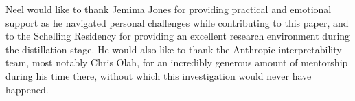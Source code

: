 \documentclass{article} %
\begin{document}
Neel would like to thank Jemima Jones for providing practical and emotional support as he navigated personal challenges while contributing to this paper, and to the Schelling Residency for providing an excellent research environment during the distillation stage. He would also like to thank the Anthropic interpretability team, most notably Chris Olah, for an incredibly generous amount of mentorship during his time there, without which this investigation would never have happened.






\newpage
\appendix





\end{document}
